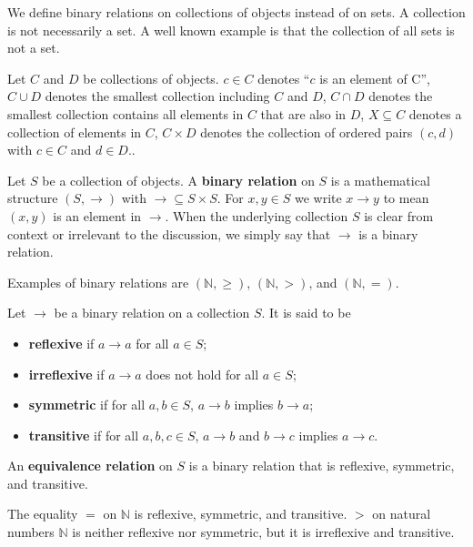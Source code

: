 We define binary relations on collections of objects instead of on sets. A collection is not necessarily a set. A well known example is that the collection of all sets is not a set.
\begin{notation}
    Let $C$ and $D$ be collections of objects. $c \in C$ denotes \enquote{$c$ is an element of C}, $C \cup D$ denotes the smallest collection including $C$ and $D$, $C \cap D$ denotes the smallest collection contains all elements in $C$ that are also in $D$,
    $X \subseteq C$ denotes a collection of elements in $C$,
     $C \times D$ denotes the collection of ordered pairs $(c,d)$ with $c \in C$ and $d \in D$.. 
  \end{notation} 
    
    
\begin{definition}
    \label{def:binary_relation:binary_relation}
    Let $S$ be a collection of objects. A \textbf{binary relation} on $S$ is a mathematical structure \((S,\to)\) with \(\to \subseteq S\times S\). For \(x,y\in S\) we write \(x\to y\) to mean \((x,y)\) is an element in \(\to\). When the underlying collection \(S\) is clear from context or irrelevant to the discussion, we simply say that \(\to\) is a binary relation.
  \end{definition}
  Examples of binary relations are \((\mathbb{N}, \geq)\), \((\mathbb{N}, >)\), and \((\mathbb{N}, =)\).
  \begin{definition}
    \label{def:binary_relation:reflexivity_transitivity}
    Let \(\to\) be a binary relation on a collection \(S\). It is said to be
    \begin{itemize}
      \item \textbf{reflexive} if $a \to a$ for all $a \in S$;
      \item \textbf{irreflexive} if $a \to a$ does not hold for all $a \in S$;
      \item \textbf{symmetric} if for all $a,b \in S$, $a \to b$ implies $b \to a$;
      \item \textbf{transitive} if for all $a,b,c \in S$, $a \to b$ and $b \to c$ implies $a \to c$.
    \end{itemize}
    An \textbf{equivalence relation} on $S$ is a binary relation that is reflexive, symmetric, and transitive.
  \end{definition}
  The equality \(=\) on \(\mathbb{N}\) is reflexive, symmetric, and transitive. \(>\) on natural numbers \(\mathbb{N}\) is neither reflexive nor symmetric, but it is irreflexive and transitive.

